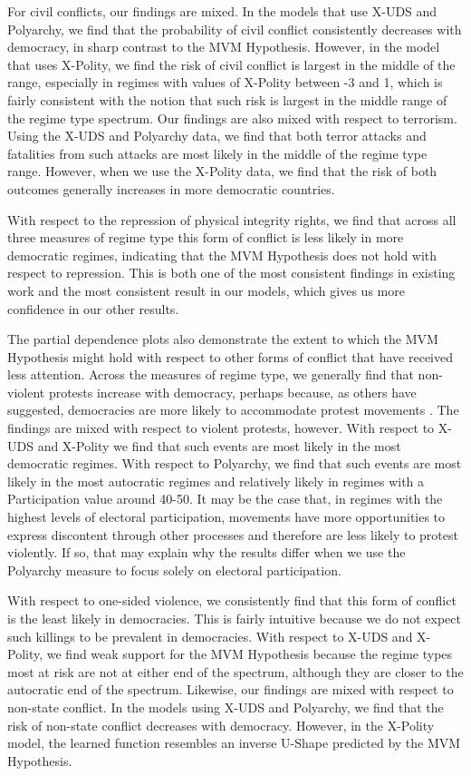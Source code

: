 \documentclass[titlepage, onecolumn,12pt]{article}
\begin{document}
For civil conflicts, our findings are mixed.  In the models that use X-UDS and Polyarchy, we find that the probability of civil conflict consistently decreases with democracy, in sharp contrast to the MVM Hypothesis.  However, in the model that uses X-Polity, we find the risk of civil conflict is largest in the middle of the range, especially in regimes with values of X-Polity between -3 and 1, which is fairly consistent with the notion that such risk is largest in the middle range of the regime type spectrum.   Our findings are also mixed with respect to terrorism.  Using the X-UDS and Polyarchy data, we find that both terror attacks and fatalities from such attacks are most likely in the middle of the regime type range.  However, when we use the X-Polity data, we find that the risk of both outcomes generally increases in more democratic countries.

With respect to the repression of physical integrity rights, we find that across all three measures of regime type this form of conflict is less likely in more democratic regimes, indicating that the MVM Hypothesis does not hold with respect to repression.  This is both one of the most consistent findings in existing work and the most consistent result in our models, which gives us more confidence in our other results.

The partial dependence plots also demonstrate the extent to which the MVM Hypothesis might hold with respect to other forms of conflict that have received less attention.  Across the measures of regime type, we generally find that non-violent protests increase with democracy, perhaps because, as others have suggested, democracies are more likely to accommodate protest movements \citep{carey2006dynamic}.  The findings are mixed with respect to violent protests, however.  With respect to X-UDS and X-Polity we find that such events are most likely in the most democratic regimes.  With respect to Polyarchy, we find that such events are most likely in the most autocratic regimes and relatively likely in regimes with a Participation value around 40-50.  It may be the case that, in regimes with the highest levels of electoral participation, movements have more opportunities to express discontent through other processes and therefore are less likely to protest violently.  If so, that may explain why the results differ when we use the Polyarchy measure to focus solely on electoral participation.

With respect to one-sided violence, we consistently find that this form of conflict is the least likely in democracies.  This is fairly intuitive because we do not expect such killings to be prevalent in democracies.  With respect to X-UDS and X-Polity, we find weak support for the MVM Hypothesis because the regime types most at risk are not at either end of the spectrum, although they are closer to the autocratic end of the spectrum.  Likewise, our findings are mixed with respect to non-state conflict.  In the models using X-UDS and Polyarchy, we find that the risk of non-state conflict decreases with democracy.  However, in the X-Polity model, the learned function resembles an inverse U-Shape predicted by the MVM Hypothesis.
\end{document}
